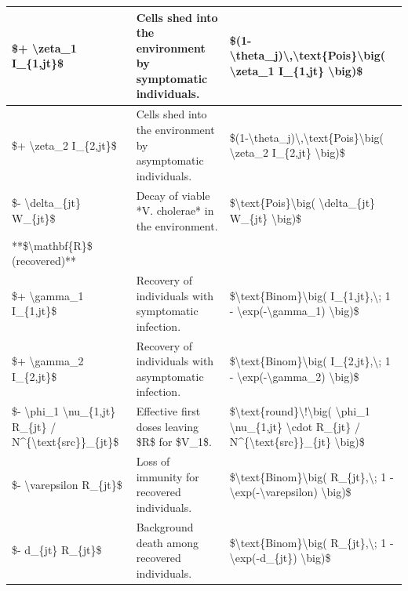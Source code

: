 \documentclass[
]{book}
\begin{document}
\begin{tabular}{l|l|l}
\$+ \textbackslash{}zeta\_1 I\_\{1,jt\}\$ & Cells shed into the environment by symptomatic individuals. & \$(1-\textbackslash{}theta\_j)\textbackslash{},\textbackslash{}text\{Pois\}\textbackslash{}big( \textbackslash{}zeta\_1 I\_\{1,jt\} \textbackslash{}big)\$\\
\hline
\$+ \textbackslash{}zeta\_2 I\_\{2,jt\}\$ & Cells shed into the environment by asymptomatic individuals. & \$(1-\textbackslash{}theta\_j)\textbackslash{},\textbackslash{}text\{Pois\}\textbackslash{}big( \textbackslash{}zeta\_2 I\_\{2,jt\} \textbackslash{}big)\$\\
\hline
\$- \textbackslash{}delta\_\{jt\} W\_\{jt\}\$ & Decay of viable *V. cholerae* in the environment. & \$\textbackslash{}text\{Pois\}\textbackslash{}big( \textbackslash{}delta\_\{jt\} W\_\{jt\} \textbackslash{}big)\$\\
\hline
**\$\textbackslash{}mathbf\{R\}\$ (recovered)** &  & \\
\hline
\$+ \textbackslash{}gamma\_1 I\_\{1,jt\}\$ & Recovery of individuals with symptomatic infection. & \$\textbackslash{}text\{Binom\}\textbackslash{}big( I\_\{1,jt\},\textbackslash{}; 1 - \textbackslash{}exp(-\textbackslash{}gamma\_1) \textbackslash{}big)\$\\
\hline
\$+ \textbackslash{}gamma\_2 I\_\{2,jt\}\$ & Recovery of individuals with asymptomatic infection. & \$\textbackslash{}text\{Binom\}\textbackslash{}big( I\_\{2,jt\},\textbackslash{}; 1 - \textbackslash{}exp(-\textbackslash{}gamma\_2) \textbackslash{}big)\$\\
\hline
\$- \textbackslash{}phi\_1 \textbackslash{}nu\_\{1,jt\} R\_\{jt\} / N\textasciicircum{}\{\textbackslash{}text\{src\}\}\_\{jt\}\$ & Effective first doses leaving \$R\$ for \$V\_1\$. & \$\textbackslash{}text\{round\}\textbackslash{}!\textbackslash{}big( \textbackslash{}phi\_1 \textbackslash{}nu\_\{1,jt\} \textbackslash{}cdot R\_\{jt\} / N\textasciicircum{}\{\textbackslash{}text\{src\}\}\_\{jt\} \textbackslash{}big)\$\\
\hline
\$- \textbackslash{}varepsilon R\_\{jt\}\$ & Loss of immunity for recovered individuals. & \$\textbackslash{}text\{Binom\}\textbackslash{}big( R\_\{jt\},\textbackslash{}; 1 - \textbackslash{}exp(-\textbackslash{}varepsilon) \textbackslash{}big)\$\\
\hline
\$- d\_\{jt\} R\_\{jt\}\$ & Background death among recovered individuals. & \$\textbackslash{}text\{Binom\}\textbackslash{}big( R\_\{jt\},\textbackslash{}; 1 - \textbackslash{}exp(-d\_\{jt\}) \textbackslash{}big)\$\\
\hline
\end{tabular}
\end{document}
